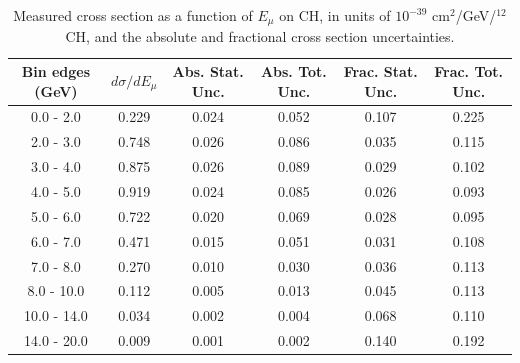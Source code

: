 \documentclass[aps,prl,twocolumn,superscriptaddress,nofootinbib]{revtex4-1}
\begin{document}
\begin{table}[h!]
  \centering
  \caption{Measured cross section as a function of $E_{\mu}$ on CH, in units of
  $10^{-39}$ $\text{cm}^{2}$/GeV/$^{12}$CH, and the absolute and
  fractional cross section uncertainties.}
    \begin{tabular}{c||c||c|c||c|c}
      Bin edges (GeV)  &  $d\sigma/dE_{\mu}$  &  Abs. Stat. Unc. & Abs. Tot. Unc.  &  Frac. Stat. Unc.  &  Frac. Tot. Unc. \\
      \hline\hline
        0.0 - 2.0 & 0.229 & 0.024 & 0.052 & 0.107 & 0.225 \\
        2.0 - 3.0 & 0.748 & 0.026 & 0.086 & 0.035 & 0.115 \\
        3.0 - 4.0 & 0.875 & 0.026 & 0.089 & 0.029 & 0.102 \\
        4.0 - 5.0 & 0.919 & 0.024 & 0.085 & 0.026 & 0.093 \\
        5.0 - 6.0 & 0.722 & 0.020 & 0.069 & 0.028 & 0.095 \\
        6.0 - 7.0 & 0.471 & 0.015 & 0.051 & 0.031 & 0.108 \\
        7.0 - 8.0 & 0.270 & 0.010 & 0.030 & 0.036 & 0.113 \\
       8.0 - 10.0 & 0.112 & 0.005 & 0.013 & 0.045 & 0.113 \\
      10.0 - 14.0 & 0.034 & 0.002 & 0.004 & 0.068 & 0.110 \\
      14.0 - 20.0 & 0.009 & 0.001 & 0.002 & 0.140 & 0.192 \\
    \end{tabular}
  \label{table:EmuXSec_CH}
\end{table}
\end{document}
